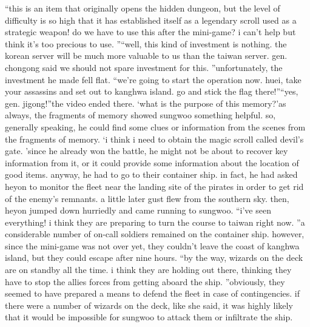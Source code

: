 “this is an item that originally opens the hidden dungeon, but the level of difficulty is so high that it has established itself as a legendary scroll used as a strategic weapon! do we have to use this after the mini-game? i can’t help but think it’s too precious to use.
”“well, this kind of investment is nothing.
 the korean server will be much more valuable to us than the taiwan server.
 gen.
 chongong said we should not spare investment for this.
”unfortunately, the investment he made fell flat.
“we’re going to start the operation now.
 huei, take your assassins and set out to kanghwa island.
 go and stick the flag there!”“yes, gen.
 jigong!”the video ended there.
‘what is the purpose of this memory?’as always, the fragments of memory showed sungwoo something helpful.
 so, generally speaking, he could find some clues or information from the scenes from the fragments of memory.
‘i think i need to obtain the magic scroll called devil’s gate.
’since he already won the battle, he might not be about to recover key information from it, or it could provide some information about the location of good items.
anyway, he had to go to their container ship.
in fact, he had asked heyon to monitor the fleet near the landing site of the pirates in order to get rid of the enemy’s remnants.
a little later gust flew from the southern sky.
 then, heyon jumped down hurriedly and came running to sungwoo.
“i’ve seen everything! i think they are preparing to turn the course to taiwan right now.
”a considerable number of on-call soldiers remained on the container ship.
 however, since the mini-game was not over yet, they couldn’t leave the coast of kanghwa island, but they could escape after nine hours.
“by the way, wizards on the deck are on standby all the time.
 i think they are holding out there, thinking they have to stop the allies forces from getting aboard the ship.
”obviously, they seemed to have prepared a means to defend the fleet in case of contingencies.
if there were a number of wizards on the deck, like she said, it was highly likely that it would be impossible for sungwoo to attack them or infiltrate the ship.


 